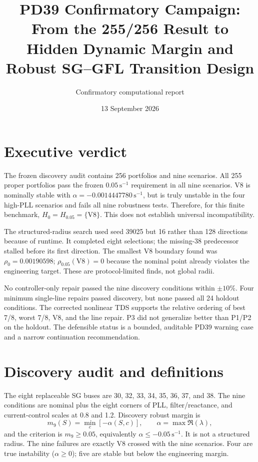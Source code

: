 \documentclass[10pt,a4paper]{article}
\title{PD39 Confirmatory Campaign: From the 255/256 Result to Hidden Dynamic Margin and Robust SG--GFL Transition Design}
\author{Confirmatory computational report}
\date{13 September 2026}
\begin{document}
\maketitle

\section*{Executive verdict}
The frozen discovery audit contains 256 portfolios and nine scenarios. All 255 proper portfolios pass the frozen $0.05\,\mathrm{s}^{-1}$ requirement in all nine scenarios. V8 is nominally stable with $\alpha=-0.0014447780\,\mathrm{s}^{-1}$, but is truly unstable in the four high-PLL scenarios and fails all nine robustness tests. Therefore, for this finite benchmark, $H_0=H_{0.05}=\{\mathrm{V8}\}$. This does not establish universal incompatibility.

The structured-radius search used seed 39025 but 16 rather than 128 directions because of runtime. It completed eight selections; the missing-38 predecessor stalled before its first direction. The smallest V8 boundary found was $\rho_0=0.00190598$; $\rho_{0.05}(\mathrm{V8})=0$ because the nominal point already violates the engineering target. These are protocol-limited finds, not global radii.

No controller-only repair passed the nine discovery conditions within $\pm10\%$. Four minimum single-line repairs passed discovery, but none passed all 24 holdout conditions. The corrected nonlinear TDS supports the relative ordering of best 7/8, worst 7/8, V8, and the line repair. P3 did not generalize better than P1/P2 on the holdout. The defensible status is a bounded, auditable PD39 warning case and a narrow continuation recommendation.

\section{Discovery audit and definitions}
The eight replaceable SG buses are 30, 32, 33, 34, 35, 36, 37, and 38. The nine conditions are nominal plus the eight corners of PLL, filter/reactance, and current-control scales at 0.8 and 1.2. Discovery robust margin is
\[
m_9(S)=\min_c[-\alpha(S,c)],\qquad \alpha=\max\Re(\lambda),
\]
and the criterion is $m_9\ge0.05$, equivalently $\alpha\le-0.05\,\mathrm{s}^{-1}$. It is not a structured radius. The nine failures are exactly V8 crossed with the nine scenarios. Four are true instability ($\alpha\ge0$); five are stable but below the engineering margin.
\end{document}
